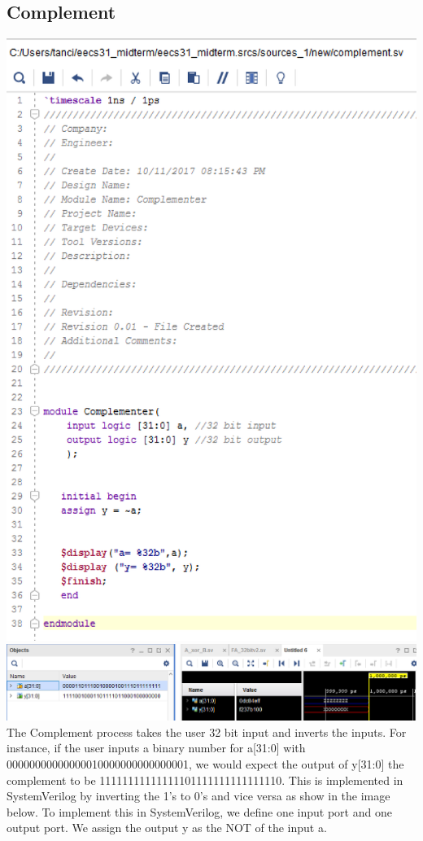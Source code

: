 \documentclass{article}
\begin{document}
\subsection{Complement}
\includegraphics[scale=0.5]{photos/complementer_code}
\break
\includegraphics[scale=0.5]{photos/complimenter_simulation}
\break
The Complement process takes the user 32 bit input and inverts the inputs. For instance, if the user inputs a binary number for a[31:0] with \\ 00000000000000010000000000000001, we would expect the output of y[31:0] the complement to be 11111111111111101111111111111110. This is implemented in SystemVerilog by inverting the 1's to 0's and vice versa as show in the image below. To implement this in SystemVerilog, we define one input port and one output port. We assign the output y as the NOT of the input a. 
\end{document}
